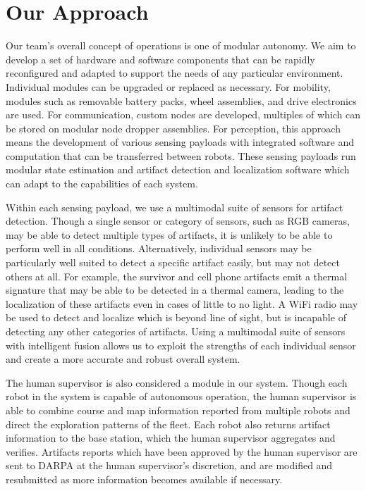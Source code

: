 \section{Our Approach}

Our team's overall concept of operations is one of modular autonomy. We aim to develop a set of hardware and software components that can be rapidly reconfigured and adapted to support the needs of any particular environment. Individual modules can be upgraded or replaced as necessary. For mobility, modules such as removable battery packs, wheel assemblies, and drive electronics are used. For communication, custom nodes are developed, multiples of which can be stored on modular node dropper assemblies. For perception, this approach means the development of various sensing payloads with integrated software and computation that can be transferred between robots. These sensing payloads run modular state estimation and artifact detection and localization software which can adapt to the capabilities of each system.

Within each sensing payload, we use a multimodal suite of sensors for artifact detection. Though a single sensor or category of sensors, such as RGB cameras, may be able to detect multiple types of artifacts, it is unlikely to be able to perform well in all conditions. Alternatively, individual sensors may be particularly well suited to detect a specific artifact easily, but may not detect others at all. For example, the survivor and cell phone artifacts emit a thermal signature that may be able to be detected in a thermal camera, leading to the localization of these artifacts even in cases of little to no light. A WiFi radio may be used to detect and localize which is beyond line of sight, but is incapable of detecting any other categories of artifacts. Using a multimodal suite of sensors with intelligent fusion allows us to exploit the strengths of each individual sensor and create a more accurate and robust overall system.

The human supervisor is also considered a module in our system. Though each robot in the system is capable of autonomous operation, the human supervisor is able to combine course and map information reported from multiple robots and direct the exploration patterns of the fleet. Each robot also returns artifact information to the base station, which the human supervisor aggregates and verifies. Artifacts reports which have been approved by the human supervisor are sent to DARPA at the human supervisor's discretion, and are modified and resubmitted as more information becomes available if necessary.

